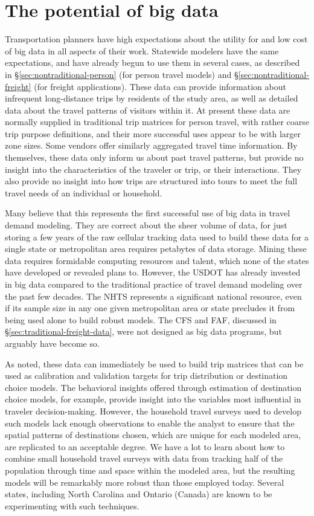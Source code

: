 \section{The potential of big data}

Transportation planners have high expectations about the utility for and low cost of big data in all aspects of their work. Statewide modelers have the same expectations, and have already begun to use them in several cases, as described in \S\ref{sec:nontraditional-person} (for person travel models) and \S\ref{sec:nontraditional-freight} (for freight applications). These data can provide information about infrequent long-distance trips by residents of the study area, as well as detailed data about the travel patterns of visitors within it. At present these data are normally supplied in traditional trip matrices for person travel, with rather coarse trip purpose definitions, and their more successful uses appear to be with larger zone sizes. Some vendors offer similarly aggregated travel time information. By themselves, these data only inform us about past travel patterns, but provide no insight into the characteristics of the traveler or trip, or their interactions. They also provide no insight into how trips are structured into tours to meet the full travel needs of an individual or household.

Many believe that this represents the first successful use of big data in travel demand modeling. They are correct about the sheer volume of data, for just storing a few years of the raw cellular tracking data used to build these data for a single state or metropolitan area requires petabytes of data storage. Mining these data requires formidable computing resources and talent, which none of the states have developed or revealed plans to. However, the USDOT has already invested in big data compared to the traditional practice of travel demand modeling over the past few decades. The NHTS represents a significant national resource, even if its sample size in any one given metropolitan area or state precludes it from being used alone to build robust models. The CFS and FAF, discussed in \S\ref{sec:traditional-freight-data}, were not designed as big data programs, but arguably have become so.

As noted, these data can immediately be used to build trip matrices that can be used as calibration and validation targets for trip distribution or destination choice models. The behavioral insights offered through estimation of destination choice models, for example, provide insight into the variables most influential in traveler decision-making. However, the household travel surveys used to develop such models lack enough observations to enable the analyst to ensure that the spatial patterns of destinations chosen, which are unique for each modeled area, are replicated to an acceptable degree. We have a lot to learn about how to combine small household travel surveys with data from tracking half of the population through time and space within the modeled area, but the resulting models will be remarkably more robust than those employed today. Several states, including North Carolina and Ontario (Canada) are known to be experimenting with such techniques.


